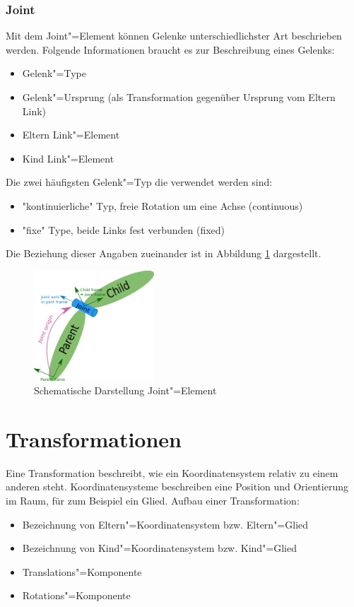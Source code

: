 \subsubsection{Joint}
\label{chap:joint}
Mit dem Joint"=Element können Gelenke unterschiedlichster Art beschrieben werden.
Folgende Informationen braucht es zur Beschreibung eines Gelenks:
\begin{itemize}
\item Gelenk"=Type
\item Gelenk"=Ursprung (als Transformation gegenüber Ursprung vom Eltern Link)
\item Eltern Link"=Element
\item Kind Link"=Element
\end{itemize}
Die zwei häufigsten Gelenk"=Typ die verwendet werden sind:
\begin{itemize}
\item \textsc{"}kontinuierliche\textsc{"} Typ, freie Rotation um eine Achse (continuous)
\item \textsc{"}fixe\textsc{"} Type, beide Links fest verbunden (fixed)
\end{itemize} 
Die Beziehung dieser Angaben  zueinander ist in Abbildung \ref{Ab:aufbaut-joint} dargestellt.
\begin{figure}[ht!]
	\centering
	\includegraphics[width=4.5cm]{images/urdf_joint.png}
	\caption{Schematische Darstellung Joint"=Element \cite{ros}}
	\label{Ab:aufbaut-joint}
\end{figure}


\section{Transformationen} %
\label{chap:transformationen}
Eine Transformation beschreibt, wie ein Koordinatensystem relativ zu einem anderen steht.
Koordinatensysteme beschreiben eine Position und Orientierung im Raum, für zum Beispiel ein Glied.
Aufbau einer Transformation:
\begin{itemize}
\item Bezeichnung von Eltern"=Koordinatensystem bzw. Eltern"=Glied
\item Bezeichnung von Kind"=Koordinatensystem bzw. Kind"=Glied
\item Translations"=Komponente
\item Rotations"=Komponente
\end{itemize}

